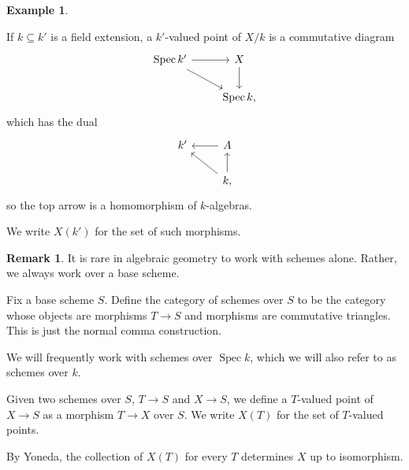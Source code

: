 \documentclass[a4paper]{amsbook}
\theoremstyle{definition}
\newtheorem*{remark*}{Remark}
\newtheorem*{example*}{Example}
\DeclareMathOperator\Spec{Spec}
\begin{document}
\begin{example*}
\begin{enumerate}
		If $k \subseteq k'$ is a field extension, a $k'$-valued point of $X/k$ is
		a commutative diagram
		\[\begin{tikzcd}
			\Spec k' \ar[r]\ar[dr] & X\ar[d]\\
			& \Spec k,
		\end{tikzcd}\]
		which has the dual
		\[\begin{tikzcd}
			k' & A\ar[l]\\
			& k\ar[u]\ar[ul],
		\end{tikzcd}\]
		so the top arrow is a homomorphism of  $k$-algebras.

		We write $X(k')$ for the set of such morphisms.
\end{enumerate}
\end{example*}

\begin{remark*}
\label{RelativePointOfView}
It is rare in algebraic geometry to work with schemes alone. Rather, we always work
over a base scheme.

Fix a base scheme $S$. Define the category of schemes over $S$ to be the
category whose objects are morphisms $T\to S$ and morphisms are commutative
triangles. This is just the normal comma construction.

We will frequently work with schemes over $\Spec k$, which we will also refer to
as schemes over $k$.

Given two schemes over $S$, $T\to S$ and $X\to S$, we define a $T$-valued point
of $X\to S$ as a morphism $T\to X$ over $S$. We write $X(T)$ for the set of
$T$-valued points.

By Yoneda, the collection of $X(T)$ for every $T$ determines $X$ up to isomorphism.
\end{remark*}
\end{document}
